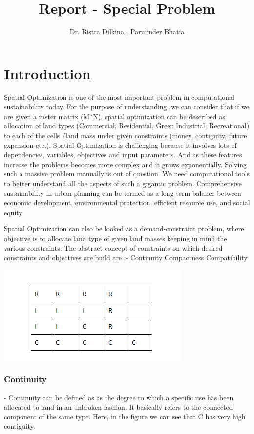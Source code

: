 \documentclass[twoside,10pt]{article}
\begin{document}
\title{Report - Special Problem }
\author{Dr. Bistra Dilkina , Parminder Bhatia}
\date{}
\maketitle

\section{Introduction}
Spatial Optimization is one of the most important problem in computational sustainability today. For the purpose of understanding ,we can consider that if we are given a raster matrix (M*N), spatial optimization can be described as allocation of land types (Commercial, Residential, Green,Industrial, Recreational) to each of the cells /land mass under given constraints (money, contiguity, future expansion etc.).  Spatial Optimization is challenging because it involves lots of dependencies, variables, objectives and input parameters. And as these features increase the problems becomes more complex and it grows exponentially. Solving such a massive problem manually is out of question. We need computational tools to better understand all the aspects of such a gigantic problem.
Comprehensive sustainability in urban planning can be termed as a long-term balance between economic development, environmental protection, efficient resource use, and social equity


Spatial Optimization can also be looked as a demand-constraint problem, where objective is to allocate land type of given land masses keeping in mind the various constraints. The abstract concept of constraints on which  desired constraints and objectives are build are :-
Continuity
Compactness
Compatibility

\graphicspath{ {images/} }
\includegraphics{raster}

\subsubsection*{Continuity} - Continuity can be defined as as the degree to which a specific use has been allocated to land in an unbroken fashion. It basically refers to the connected component of the same type. Here, in the figure we can see that C has very high contiguity.
\end{document}
